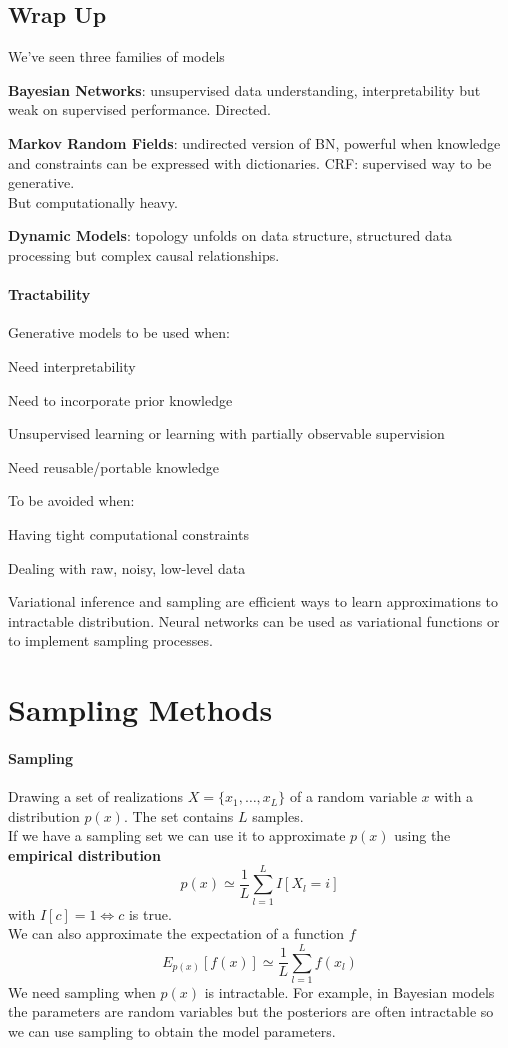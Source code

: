 \documentclass[10pt]{report}
\begin{document}
\subsection{Wrap Up}
We've seen three families of models\begin{list}{}{}
	\item \textbf{Bayesian Networks}: unsupervised data understanding, interpretability but weak on supervised performance. Directed.
	\item \textbf{Markov Random Fields}: undirected version of BN, powerful when knowledge and constraints can be expressed with dictionaries. CRF: supervised way to be generative.\\
	But computationally heavy.
	\item \textbf{Dynamic Models}: topology unfolds on data structure, structured data processing but complex causal relationships.
\end{list}
\paragraph{Tractability} Generative models to be used when:
\begin{list}{}{}
	\item Need interpretability
	\item Need to incorporate prior knowledge
	\item Unsupervised learning or learning with partially observable supervision
	\item Need reusable/portable knowledge
\end{list}
To be avoided when:
\begin{list}{}{}
	\item Having tight computational constraints
	\item Dealing with raw, noisy, low-level data
\end{list}
Variational inference and sampling are efficient ways to learn approximations to intractable distribution. Neural networks can be used as variational functions or to implement sampling processes.
\section{Sampling Methods} 
\paragraph{Sampling} Drawing a set of realizations $X = \{x_1,\ldots,x_L\}$ of a random variable $x$ with a distribution $p(x)$. The set contains $L$ samples.\\
If we have a sampling set we can use it to approximate $p(x)$ using the \textbf{empirical distribution} $$p(x)\simeq \frac{1}{L}\sum_{l=1}^L I[X_l = i]$$ with $I[c] = 1 \Leftrightarrow c$ is true.\\
We can also approximate the expectation of a function $f$ $$E_{p(x)}[f(x)]\simeq \frac{1}{L}\sum_{l=1}^L f(x_l)$$
We need sampling when $p(x)$ is intractable. For example, in Bayesian models the parameters are random variables but the posteriors are often intractable so we can use sampling to obtain the model parameters.
\end{document}
